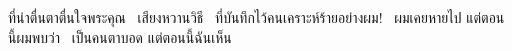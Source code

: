 ที่น่าตื่นตาตื่นใจพระคุณ 
เสียงหวานวิธี 
ที่บันทึกไว้คนเคราะห์ร้ายอย่างผม! 
ผมเคยหายไป แต่ตอนนี้ผมพบว่า  
เป็นคนตาบอด แต่ตอนนี้ฉันเห็น 
